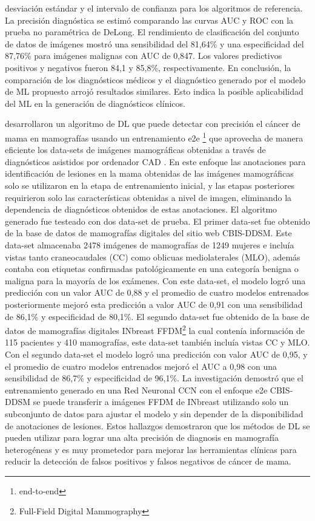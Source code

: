 desviación estándar y el intervalo de confianza para los algoritmos de referencia.  La precisión diagnóstica se estimó comparando las curvas AUC y ROC con la prueba no paramétrica de DeLong. El rendimiento de clasificación del conjunto de datos de imágenes mostró una sensibilidad del 81,64\% y una especificidad del 87,76\% para imágenes malignas con AUC de 0,847. Los valores predictivos positivos y negativos fueron 84,1 y 85,8\%, respectivamente. En conclusión, la comparación de los diagnósticos médicos y el diagnóstico generado por el modelo de ML propuesto arrojó resultados similares. Esto indica la posible aplicabilidad del ML en la generación de diagnósticos clínicos.

\citep{Shen2019} desarrollaron un algoritmo de DL que puede detectar con precisión el cáncer de mama en mamografías usando un entrenamiento e2e \footnote{end-to-end} que aprovecha de manera eficiente los data-sets de imágenes mamográficas obtenidas a través de diagnósticos asistidos por ordenador CAD . En este enfoque las anotaciones para identificación de lesiones en la mama obtenidas de las imágenes mamográficas solo se utilizaron en la etapa de entrenamiento inicial, y las etapas posteriores requirieron solo las características obtenidas a nivel de imagen, eliminando la dependencia de diagnósticos obtenidos de estas anotaciones. El algoritmo generado fue testeado con dos data-set de prueba. El primer data-set fue obtenido de la base de datos de mamografías digitales del sitio web CBIS-DDSM. Este data-set almacenaba 2478 imágenes de mamografías de 1249 mujeres e incluía vistas tanto craneocaudales (CC) como oblicuas mediolaterales (MLO), además contaba con etiquetas confirmadas patológicamente en una categoría benigna o maligna para la mayoría de los exámenes. Con este data-set, el modelo logró una predicción con un valor AUC de 0,88 y el promedio de cuatro modelos entrenados posteriormente mejoró esta predicción a valor AUC de 0,91 con una sensibilidad de 86,1\% y especificidad de 80,1\%. El segundo data-set fue obtenido de la base de datos de mamografías digitales INbreast FFDM\footnote{Full-Field Digital Mammography} la cual contenía información de 115 pacientes y 410 mamografías, este data-set también incluía vistas CC y MLO. Con el segundo data-set el modelo logró una predicción con valor AUC de 0,95, y el promedio de cuatro modelos entrenados mejoró el AUC a 0,98 con una sensibilidad de 86,7\% y especificidad de 96,1\%. La investigación demostró que el entrenamiento generado en una Red Neuronal CCN con el enfoque e2e CBIS-DDSM se puede transferir a imágenes FFDM de INbreast utilizando solo un subconjunto de datos para ajustar el modelo y sin depender de la disponibilidad de anotaciones de lesiones. Estos hallazgos demostraron que los métodos de DL se pueden utilizar para lograr una alta precisión de diagnosis en mamografía heterogéneas y es muy prometedor para mejorar las herramientas clínicas para reducir la detección de falsos positivos y falsos negativos de cáncer de mama.

